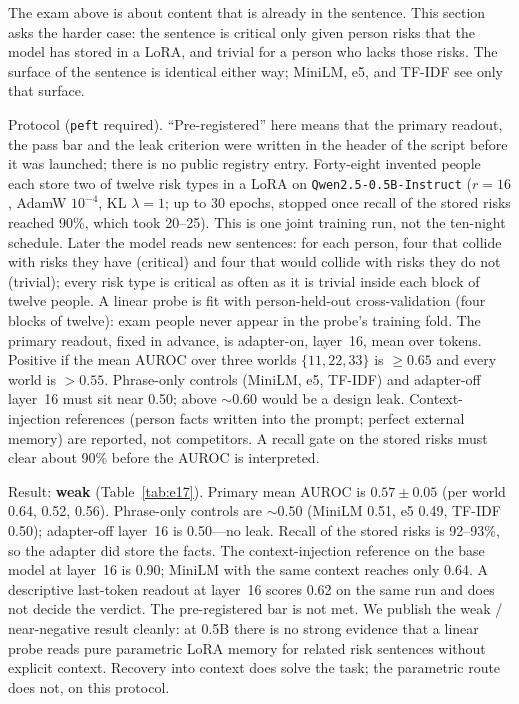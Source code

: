 \documentclass[11pt,a4paper]{article}
\begin{document}
The exam above is about content that is already in the sentence.
This section asks the harder case: the sentence is critical only given person risks that the model has stored in a LoRA, and trivial for a person who lacks those risks.
The surface of the sentence is identical either way; MiniLM, e5, and TF-IDF see only that surface.

Protocol (\texttt{peft} required). ``Pre-registered'' here means that the primary readout, the pass bar and the leak criterion were written in the header of the script before it was launched; there is no public registry entry.
Forty-eight invented people each store two of twelve risk types in a LoRA on \texttt{Qwen2.5-0.5B-Instruct} ($r{=}16$, AdamW $10^{-4}$, KL $\lambda{=}1$; up to 30 epochs, stopped once recall of the stored risks reached 90\%, which took 20--25). This is one joint training run, not the ten-night schedule.
Later the model reads new sentences: for each person, four that collide with risks they have (critical) and four that would collide with risks they do not (trivial); every risk type is critical as often as it is trivial inside each block of twelve people.
A linear probe is fit with person-held-out cross-validation (four blocks of twelve): exam people never appear in the probe's training fold.
The primary readout, fixed in advance, is adapter-on, layer~16, mean over tokens.
Positive if the mean AUROC over three worlds $\{11,22,33\}$ is $\geq 0.65$ and every world is $>0.55$.
Phrase-only controls (MiniLM, e5, TF-IDF) and adapter-off layer~16 must sit near 0.50; above ${\sim}0.60$ would be a design leak.
Context-injection references (person facts written into the prompt; perfect external memory) are reported, not competitors.
A recall gate on the stored risks must clear about 90\% before the AUROC is interpreted.

Result: \textbf{weak} (Table~\ref{tab:e17}).
Primary mean AUROC is $0.57{\pm}0.05$ (per world 0.64, 0.52, 0.56).
Phrase-only controls are ${\sim}0.50$ (MiniLM 0.51, e5 0.49, TF-IDF 0.50); adapter-off layer~16 is 0.50---no leak.
Recall of the stored risks is 92--93\%, so the adapter did store the facts.
The context-injection reference on the base model at layer~16 is 0.90; MiniLM with the same context reaches only 0.64.
A descriptive last-token readout at layer~16 scores 0.62 on the same run and does not decide the verdict.
The pre-registered bar is not met.
We publish the weak / near-negative result cleanly: at 0.5B there is no strong evidence that a linear probe reads pure parametric LoRA memory for related risk sentences without explicit context.
Recovery into context does solve the task; the parametric route does not, on this protocol.
\end{document}
